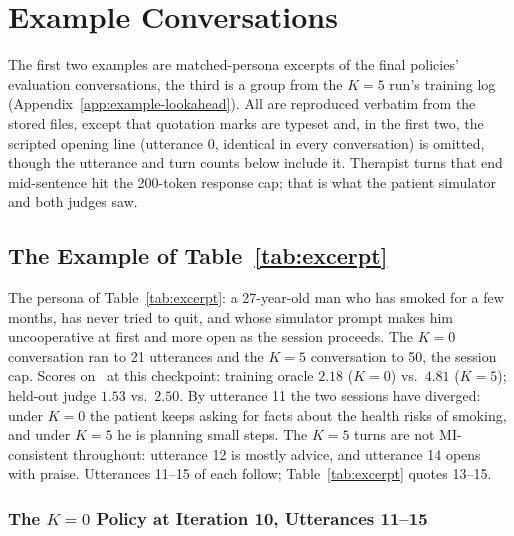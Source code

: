 \section{Example Conversations}
\label{app:example}

The first two examples are matched-persona excerpts of the final policies' evaluation
conversations, the third is a group from the $K{=}5$ run's training log
(Appendix~\ref{app:example-lookahead}). All are reproduced verbatim
from the stored files, except that quotation marks are typeset and, in the first two, the
scripted opening line (utterance 0, identical in every conversation) is omitted, though the
utterance and turn counts below include it. Therapist turns that end mid-sentence hit the 200-token response cap; that is
what the patient simulator and both judges saw.

\subsection{The Example of Table~\ref{tab:excerpt}}
\label{app:example-clear}

The persona of Table~\ref{tab:excerpt}: a 27-year-old man who has smoked for a few months, has never
tried to quit, and whose simulator prompt makes him uncooperative at first and more open as the
session proceeds. The $K{=}0$ conversation ran to 21 utterances and the $K{=}5$ conversation to 50,
the session cap. Scores on \QQ\ at this checkpoint: training oracle $2.18$ ($K{=}0$) vs.\ $4.81$
($K{=}5$); held-out judge $1.53$ vs.\ $2.50$. By utterance 11 the two sessions have diverged: under
$K{=}0$ the patient keeps asking for facts about the health risks of smoking, and under $K{=}5$ he
is planning small steps. The $K{=}5$ turns are not MI-consistent throughout: utterance 12 is mostly
advice, and utterance 14 opens with praise. Utterances 11--15 of each follow;
Table~\ref{tab:excerpt} quotes 13--15.

\small

\subsubsection*{\boldmath The $K{=}0$ Policy at Iteration 10, Utterances 11--15}

